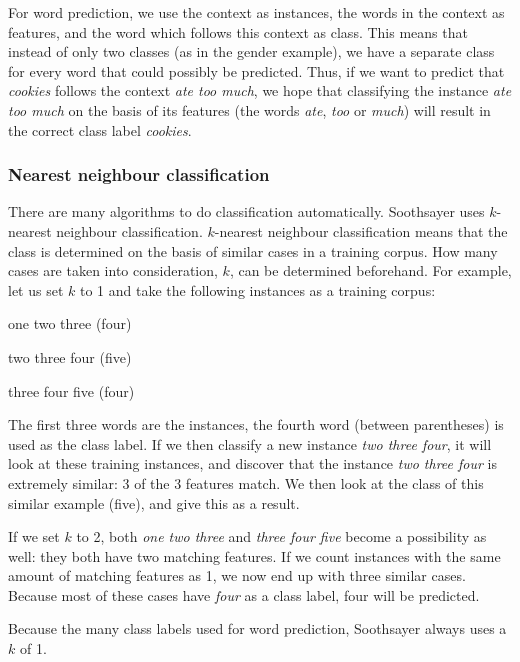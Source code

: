 \documentclass[12pt]{article}
\begin{document}
For word prediction, we use the context as instances, the words in the context as features, and the word which follows this context as class. This means that instead of only two classes (as in the gender example), we have a separate class for every word that could possibly be predicted. Thus, if we want to predict that \emph{cookies} follows the context \emph{ate too much}, we hope that classifying the instance \emph{ate too much} on the basis of its features (the words \emph{ate}, \emph{too} or \emph{much}) will result in the correct class label \emph{cookies}.

\subsubsection{Nearest neighbour classification}

There are many algorithms to do classification automatically. Soothsayer uses $k$-nearest neighbour classification. $k$-nearest neighbour classification means that the class is determined on the basis of similar cases in a training corpus. How many cases are taken into consideration, $k$, can be determined beforehand. For example, let us set $k$ to 1 and take the following instances as a training corpus:

\begin{examples}
\item one two three (four)
\item two three four (five)
\item three four five (four)
\end{examples}

The first three words are the instances, the fourth word (between parentheses) is used as the class label. If we then classify a new instance \emph{two three four}, it will look at these training instances, and discover that the instance \emph{two three four} is extremely similar: 3 of the 3 features match. We then look at the class of this similar example (five), and give this as a result. 

If we set $k$ to 2, both \emph{one two three} and \emph{three four five} become a possibility as well: they both have two matching features. If we count instances with the same amount of matching features as 1, we now end up with three similar cases. Because most of these cases have \emph{four} as a class label, four will be predicted.

Because the many class labels used for word prediction, Soothsayer always uses a $k$ of 1.
\end{document}
